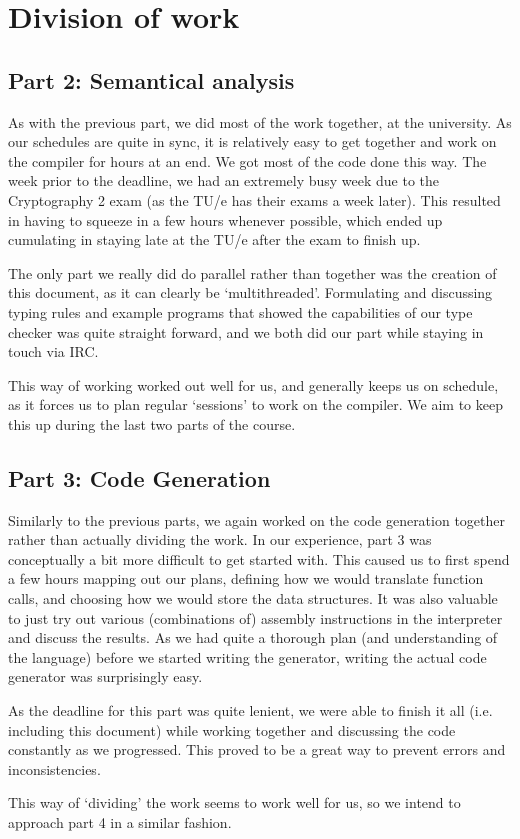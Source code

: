 \documentclass[a4paper]{article}
\begin{document}
\section{Division of work}

\subsection{Part 2: Semantical analysis}
As with the previous part, we did most of the work together, at the university. As our schedules are quite in sync, it is relatively easy to get together and work on the compiler for hours at an end. We got most of the code done this way. The week prior to the deadline, we had an extremely busy week due to the Cryptography 2 exam (as the TU/e has their exams a week later). This resulted in having to squeeze in a few hours whenever possible, which ended up cumulating in staying late at the TU/e after the exam to finish up.

The only part we really did do parallel rather than together was the creation of this document, as it can clearly be `multithreaded'. Formulating and discussing typing rules and example programs that showed the capabilities of our type checker was quite straight forward, and we both did our part while staying in touch via IRC.

This way of working worked out well for us, and generally keeps us on schedule, as it forces us to plan regular `sessions' to work on the compiler. We aim to keep this up during the last two parts of the course.

\subsection{Part 3: Code Generation}

Similarly to the previous parts, we again worked on the code generation together rather than actually dividing the work. In our experience, part 3 was conceptually a bit more difficult to get started with. This caused us to first spend a few hours mapping out our plans, defining how we would translate function calls, and choosing how we would store the data structures. It was also valuable to just try out various (combinations of) assembly instructions in the interpreter and discuss the results. As we had quite a thorough plan (and understanding of the language) before we started writing the generator, writing the actual code generator was surprisingly easy.

As the deadline for this part was quite lenient, we were able to finish it all (i.e. including this document) while working together and discussing the code constantly as we progressed. This proved to be a great way to prevent errors and inconsistencies.

This way of `dividing' the work seems to work well for us, so we intend to approach part 4 in a similar fashion.
\end{document}
